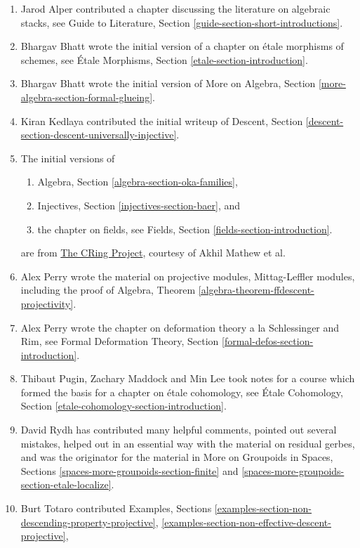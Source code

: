\begin{enumerate}
\item Jarod Alper contributed a chapter discussing the literature
on algebraic stacks, see
Guide to Literature, Section \ref{guide-section-short-introductions}.
\item Bhargav Bhatt wrote the initial version of a chapter
on \'etale morphisms of schemes, see
\'Etale Morphisms, Section \ref{etale-section-introduction}.
\item Bhargav Bhatt wrote the initial version of
More on Algebra, Section \ref{more-algebra-section-formal-glueing}.
\item Kiran Kedlaya contributed the initial writeup of
Descent, Section \ref{descent-section-descent-universally-injective}.
\item The initial versions of
\begin{enumerate}
\item Algebra, Section \ref{algebra-section-oka-families},
\item Injectives, Section \ref{injectives-section-baer}, and
\item the chapter on fields, see
Fields, Section \ref{fields-section-introduction}.
\end{enumerate}
are from
\href{https://people.fas.harvard.edu/~amathew/cr.html}{The CRing Project},
courtesy of Akhil Mathew et al.
\item Alex Perry wrote the material on projective modules,
Mittag-Leffler modules, including the proof of
Algebra, Theorem \ref{algebra-theorem-ffdescent-projectivity}.
\item Alex Perry wrote the chapter on deformation theory a la Schlessinger
and Rim, see
Formal Deformation Theory, Section \ref{formal-defos-section-introduction}.
\item Thibaut Pugin, Zachary Maddock and Min Lee took notes for
a course which formed the basis for a chapter on \'etale cohomology, see
\'Etale Cohomology, Section \ref{etale-cohomology-section-introduction}.
\item David Rydh has contributed many helpful comments, pointed out several
mistakes, helped out in an essential way with the material on residual gerbes,
and was the originator for the material in
More on Groupoids in Spaces, Sections
\ref{spaces-more-groupoids-section-finite} and
\ref{spaces-more-groupoids-section-etale-localize}.
\item Burt Totaro contributed Examples, Sections
\ref{examples-section-non-descending-property-projective},
\ref{examples-section-non-effective-descent-projective},

\end{enumerate}
